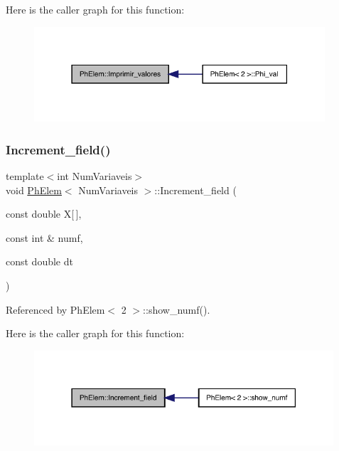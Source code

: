 Here is the caller graph for this function\+:
\nopagebreak
\begin{figure}[H]
\begin{center}
\leavevmode
\includegraphics[width=307pt]{classPhElem_a6f8258d7b66de04cd4d88f2c8af41541_icgraph}
\end{center}
\end{figure}
\mbox{\label{classPhElem_afac13525ce0e8907ca74a7213aa72504}} 
\subsubsection{\texorpdfstring{Increment\+\_\+field()}{Increment\_field()}}
{\footnotesize\ttfamily template$<$int Num\+Variaveis$>$ \\
void \hyperlink{classPhElem}{Ph\+Elem}$<$ Num\+Variaveis $>$\+::Increment\+\_\+field (\begin{DoxyParamCaption}\item[{const double}]{X\mbox{[}$\,$\mbox{]},  }\item[{const int \&}]{numf,  }\item[{const double}]{dt }\end{DoxyParamCaption})}



Referenced by Ph\+Elem$<$ 2 $>$\+::show\+\_\+numf().

Here is the caller graph for this function\+:
\nopagebreak
\begin{figure}[H]
\begin{center}
\leavevmode
\includegraphics[width=316pt]{classPhElem_afac13525ce0e8907ca74a7213aa72504_icgraph}
\end{center}
\end{figure}
\mbox{\label{classPhElem_a98449dc77f691781f54fc8798bea03a3}} 
